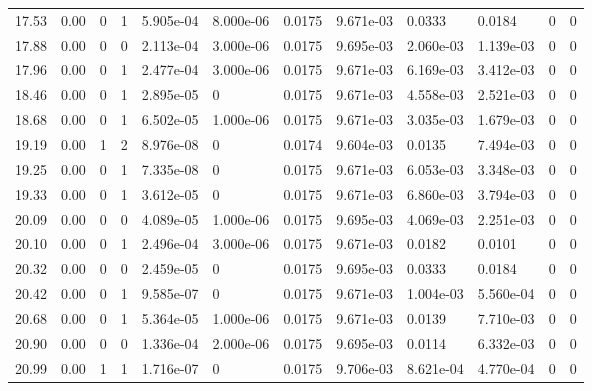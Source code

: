 \documentclass[preview]{standalone}
\begin{document}
{{{\begin{tabular}{L{1.2cm}C{1.2cm} C{0.3cm}C{0.5cm} C{1.4cm}C{1.4cm} C{1.4cm}C{1.4cm} C{1.6cm}C{1.6cm} C{1.6cm}C{1.6cm}}
  17.53  &  0.00  & 0     &  1 &  5.905e-04  & 8.000e-06  &  0.0175&   9.671e-03& 0.0333 & 0.0184   &  0 & 0  \\ 
  17.88  &  0.00  & 0     &  0 &  2.113e-04  & 3.000e-06  &  0.0175&   9.695e-03& 2.060e-03 & 1.139e-03   &  0 & 0  \\ 
  17.96  &  0.00  & 0     &  1 &  2.477e-04  & 3.000e-06  &  0.0175&   9.671e-03& 6.169e-03 & 3.412e-03   &  0 & 0  \\ 
  18.46  &  0.00  & 0     &  1 &  2.895e-05  & 0  &  0.0175&   9.671e-03& 4.558e-03 & 2.521e-03   &  0 & 0  \\ 
  18.68  &  0.00  & 0     &  1 &  6.502e-05  & 1.000e-06  &  0.0175&   9.671e-03& 3.035e-03 & 1.679e-03   &  0 & 0  \\ 
  19.19  &  0.00  & 1     &  2 &  8.976e-08  & 0  &  0.0174&   9.604e-03& 0.0135 & 7.494e-03   &  0 & 0  \\ 
  19.25  &  0.00  & 0     &  1 &  7.335e-08  & 0  &  0.0175&   9.671e-03& 6.053e-03 & 3.348e-03   &  0 & 0  \\ 
  19.33  &  0.00  & 0     &  1 &  3.612e-05  & 0  &  0.0175&   9.671e-03& 6.860e-03 & 3.794e-03   &  0 & 0  \\ 
  20.09  &  0.00  & 0     &  0 &  4.089e-05  & 1.000e-06  &  0.0175&   9.695e-03& 4.069e-03 & 2.251e-03   &  0 & 0  \\ 
  20.10  &  0.00  & 0     &  1 &  2.496e-04  & 3.000e-06  &  0.0175&   9.671e-03& 0.0182 & 0.0101   &  0 & 0  \\ 
  20.32  &  0.00  & 0     &  0 &  2.459e-05  & 0  &  0.0175&   9.695e-03& 0.0333 & 0.0184   &  0 & 0  \\ 
  20.42  &  0.00  & 0     &  1 &  9.585e-07  & 0  &  0.0175&   9.671e-03& 1.004e-03 & 5.560e-04   &  0 & 0  \\ 
  20.68  &  0.00  & 0     &  1 &  5.364e-05  & 1.000e-06  &  0.0175&   9.671e-03& 0.0139 & 7.710e-03   &  0 & 0  \\ 
  20.90  &  0.00  & 0     &  0 &  1.336e-04  & 2.000e-06  &  0.0175&   9.695e-03& 0.0114 & 6.332e-03   &  0 & 0  \\ 
  20.99  &  0.00  & 1     &  1 &  1.716e-07  & 0  &  0.0175&   9.706e-03& 8.621e-04 & 4.770e-04   &  0 & 0  \\ 
\hline 
\end{tabular} 

}}}
\end{document}

